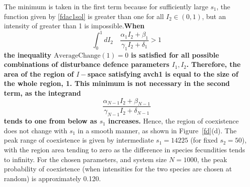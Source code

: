 \documentclass[preprint,10pt,reqno]{report}
\begin{document}
The minimum is taken in the first term because for sufficiently large $s_1$, the function given by \eqref{fdac1sol} is greater than one for all $I_2 \in (0,1)$, but an intensity of greater than 1 is impossible.\textbf{When
\begin{equation}
\label{fdto:lbint}
\int_0^1 dI_2 \quad \frac{\alpha_1 I_2 +\beta_1}{\gamma_1 I_2+\delta_1} >1
\end{equation}
the inequality $\text{AverageChange}(1)=0$ is satisfied for all possible combinations of disturbance defence parameters $I_1,I_2$. Therefore, the area of the region of $I-$space satisfying {avch1} is equal to the size of the whole region, 1. This minimum is not necessary in the second term, as the integrand
$$
\frac{\alpha_{N-1} I_2 +\beta_{N-1}}{\gamma_{N-1} I_2+\delta_{N-1}}
$$
tends to one from below as $s_1$ increases.}
 Hence, the region of coexistence does not change with $s_1$ in a smooth manner, as shown in Figure~\ref{fd}(d). The peak range of coexistence is given by intermediate $s_1=14225$ (for fixed $s_2=50$), with the region area tending to zero as the difference in species fecundities tends to infinity. For the chosen parameters, and system size $N=1000$, the peak probability of coexistence (when intensities for the two species are chosen at random) is approximately 0.120.
\end{document}
